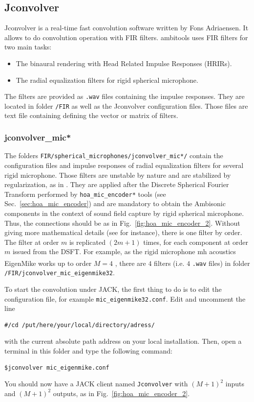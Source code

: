 \documentclass[10pt,a4paper]{article}
\begin{document}
\pagebreak
\subsection{Jconvolver}
Jconvolver is a real-time fast convolution software written by Fons Adriaensen. It allows to do convolution operation with FIR filters. ambitools uses FIR filters for two main tasks:
\begin{itemize}
\item The binaural rendering with Head Related Impulse Responses (HRIRs).
\item The radial equalization filters for rigid spherical microphone.
\end{itemize}
The filters are provided as \lstinline'.wav' files containing the impulse responses. They are located in folder \lstinline'/FIR' as well as the Jconvolver configuration files. Those files are text file containing defining the vector or matrix of filters.

\label{sec:jconvolver}
\subsubsection{jconvolver\_mic*}
The folders \lstinline'FIR/spherical_microphones/jconvolver_mic*/' contain the configuration files and impulse responses of radial equalization filters for several rigid microphone. Those filters are unstable by nature and are stabilized by regularization, as in \cite{moreau20063d}. They are applied after the Discrete Spherical Fourier Transform performed by \lstinline'hoa_mic_encoder*' tools (see Sec.~\ref{sec:hoa_mic_encoder}) and are mandatory to obtain the Ambisonic components in the context of sound field capture by rigid spherical microphone. Thus, the connections should be as in Fig.~\ref{fig:hoa_mic_encoder_2}. Without giving more mathematical details (see \cite{daniel2000representation,moreau20063d,lecomte2015on} for instance), there is one filter by order. The filter at order $m$ is replicated $(2 m +1)$ times, for each component at order $m$ issued from the DSFT. For example, as the rigid microphone mh acoustics EigenMike\textsuperscript{\textregistered} works up to order $M=4$ \cite{elko2009audio}, there are $4$ filters (i.e. $4$ \lstinline'.wav' files) in folder \lstinline'/FIR/jconvolver_mic_eigenmike32'. 

To start the convolution under JACK, the first thing to do is to edit the configuration file, for example \lstinline'mic_eigenmike32.conf'. Edit and uncomment the line 
\begin{lstlisting}
#/cd /put/here/your/local/directory/adress/
\end{lstlisting}
with the current absolute path address on your local installation.
Then, open a terminal in this folder and type the following command:
\begin{lstlisting}
$jconvolver mic_eigenmike.conf
\end{lstlisting}
You should now have a JACK client named \lstinline'Jconvolver' with $(M+1)^2$ inputs and $(M+1)^2$ outputs, as in Fig.~\ref{fig:hoa_mic_encoder_2}.
\end{document}
